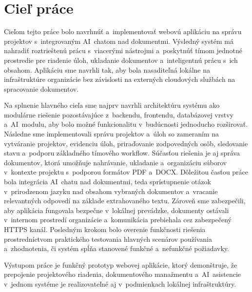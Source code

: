 \chapter{Cieľ práce}

        Cieľom tejto práce bolo navrhnúť a~implementovať webovú aplikáciu na správu projektov
s~integrovaným AI~chatom nad dokumentmi. Výsledný systém má nahradiť roztrieštenú prácu
s~viacerými nástrojmi a~poskytnúť tímom jednotné prostredie pre riadenie úloh, ukladanie
dokumentov a~inteligentnú prácu s~ich obsahom. Aplikáciu sme navrhli tak, aby bola nasaditeľná
lokálne na infraštruktúre organizácie bez závislosti na externých cloudových službách na
spracovanie dokumentov.

Na splnenie hlavného cieľa sme najprv navrhli architektúru systému ako modulárne
riešenie pozostávajúce z~backendu, frontendu, databázovej vrstvy a~AI~modulu, aby
bolo možné funkcionalitu v~budúcnosti jednoducho rozširovať. Následne sme implementovali
správu projektov a~úloh so zameraním na vytváranie projektov, evidenciu úloh, priraďovanie
zodpovedných osôb, sledovanie stavu a~podporu základného tímového workflow. Súčasťou
riešenia je aj správa dokumentov, ktorá umožňuje nahrávanie, ukladanie a~organizáciu
súborov v~kontexte projektu s~podporou formátov PDF a~DOCX. Dôležitou časťou práce
bola integrácia AI~chatu nad dokumentmi, teda sprístupnenie otázok v~prirodzenom jazyku
nad obsahom vybraných dokumentov a~vracanie relevantných odpovedí na základe extrahovaného
textu. Zároveň sme zabezpečili, aby aplikácia fungovala bezpečne v~lokálnej prevádzke,
dokumenty ostávali v~internom prostredí organizácie a~komunikácia prebiehala cez zabezpečený
HTTPS kanál. Posledným krokom bolo overenie funkčnosti riešenia prostredníctvom praktického
testovania hlavných scenárov používania a~zhodnotenia, či systém spĺňa stanovené funkčné
a~nefunkčné požiadavky.

Výstupom práce je funkčný prototyp webovej aplikácie, ktorý demonštruje,
že prepojenie projektového riadenia, dokumentového manažmentu a~AI~asistencie
v~jednom systéme je realizovateľné aj v~podmienkach lokálnej infraštruktúry.
